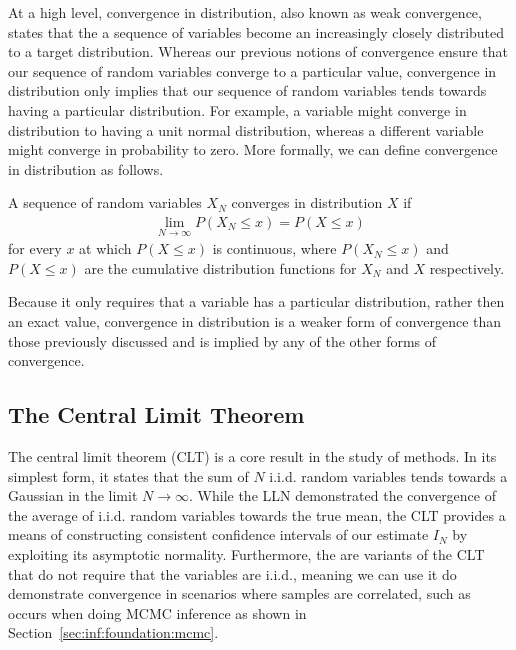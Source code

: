 At a  high level, convergence in distribution, also known as weak convergence, states that the a sequence of variables become
an increasingly closely distributed to a target distribution.  Whereas our previous notions of
convergence ensure that our sequence of random variables converge to a particular value, 
convergence in distribution only implies that our sequence of random variables tends towards
having a particular distribution.  For example, a variable might converge in distribution to
having a unit normal distribution, whereas a different variable might converge in probability
to zero. More formally, we can define convergence in distribution as follows.
\begin{definition}
	A sequence of random variables $X_N$ converges in distribution $X$  if
	\begin{align}
		\lim\limits_{N\rightarrow\infty} P(X_N \le x) = P(X \le x)
	\end{align}
	for every $x$ at which $P(X\le x)$ is continuous, where $P(X_N \le x) $ and $P(X \le x)$
	are the cumulative distribution functions for $X_N$ and $X$ respectively.
\end{definition}
 Because it only requires that a variable has a particular distribution, rather then an
 exact value, convergence in distribution is a weaker form of convergence than those previously
 discussed and is implied by any of the other forms of convergence.  

\subsection{The Central Limit Theorem}
\label{sec:inf:mc:clt}

The central limit theorem (CLT) is a core result in the study of \mc methods.  In its simplest form,
it states that the sum of $N$ i.i.d. random variables tends towards a Gaussian in the limit $N\to\infty$.
While the LLN demonstrated the convergence of the average of i.i.d. random variables towards
the true mean, the CLT provides a means of constructing consistent confidence intervals of our estimate
$I_N$ by exploiting its asymptotic normality.  Furthermore, the are variants of the CLT that do not
require that the variables are i.i.d., meaning we can use it do demonstrate convergence in scenarios
where samples are correlated, such as occurs when doing MCMC inference as shown in
Section~\ref{sec:inf:foundation:mcmc}.

